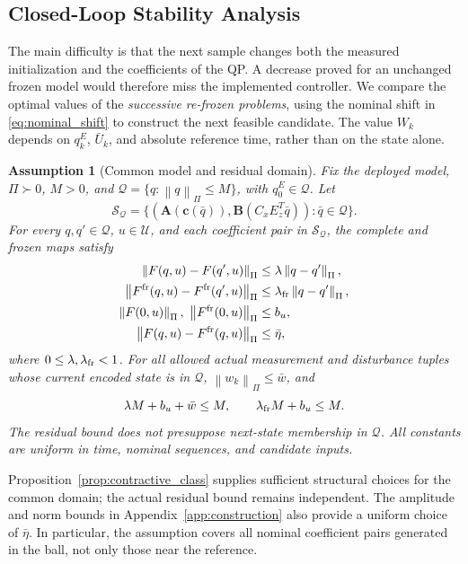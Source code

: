 \documentclass[journal]{IEEEtran}
\newtheorem{assumption}{Assumption}
\newcommand{\vc}{\mathbf{c}}
\newcommand{\mA}{\mathbf{A}}
\newcommand{\mB}{\mathbf{B}}
\newcommand{\norm}[1]{\left\lVert #1\right\rVert}
\begin{document}
\subsection{Closed-Loop Stability Analysis}
\label{subsec:closed_loop}
The main difficulty is that the next sample changes both the measured initialization and the coefficients of the QP. A decrease proved for an unchanged frozen model would therefore miss the implemented controller. We compare the optimal values of the \emph{successive re-frozen problems}, using the nominal shift in \eqref{eq:nominal_shift} to construct the next feasible candidate. The value $W_k$ depends on $q_k^E$, $\bar U_k$, and absolute reference time, rather than on the state alone.

\begin{assumption}[Common model and residual domain]
\label{ass:domain}
Fix the deployed model, $\Pi\succ0$, $M>0$, and $\mathcal Q=\{q:\norm{q}_\Pi\le M\}$, with $q_0^E\in\mathcal Q$. Let
\begin{equation}
\mathcal S_{\mathcal Q}=\{(\mA(\vc(\bar q)),\mB(C_xE_z^T\bar q)):
\bar q\in\mathcal Q\}.
\label{eq:frozen_family}
\end{equation}
For every $q,q'\in\mathcal Q$, $u\in\mathcal U$, and each coefficient pair in $\mathcal S_{\mathcal Q}$, the complete and frozen maps satisfy
\begin{align}
\norm{F(q,u)-F(q',u)}_\Pi&\le\lambda\norm{q-q'}_\Pi,\nonumber\\
\norm{F^{\rm fr}(q,u)-F^{\rm fr}(q',u)}_\Pi
&\le\lambda_{\rm fr}\norm{q-q'}_\Pi,\label{eq:common_contraction}\\
\norm{F(0,u)}_\Pi,\ \norm{F^{\rm fr}(0,u)}_\Pi&\le b_u,\nonumber\\
\norm{F(q,u)-F^{\rm fr}(q,u)}_\Pi&\le\bar\eta,\nonumber
\end{align}
where $0\le\lambda,\lambda_{\rm fr}<1$. For all allowed actual measurement and disturbance tuples whose current encoded state is in $\mathcal Q$, $\norm{w_k}_\Pi\le\bar w$, and
\begin{equation}
\lambda M+b_u+\bar w\le M,\qquad
\lambda_{\rm fr}M+b_u\le M.
\label{eq:domain_radius}
\end{equation}
The residual bound does not presuppose next-state membership in $\mathcal Q$. All constants are uniform in time, nominal sequences, and candidate inputs.
\end{assumption}

Proposition~\ref{prop:contractive_class} supplies sufficient structural choices for the common domain; the actual residual bound remains independent. The amplitude and norm bounds in Appendix~\ref{app:construction} also provide a uniform choice of $\bar\eta$. In particular, the assumption covers all nominal coefficient pairs generated in the ball, not only those near the reference.
\end{document}
